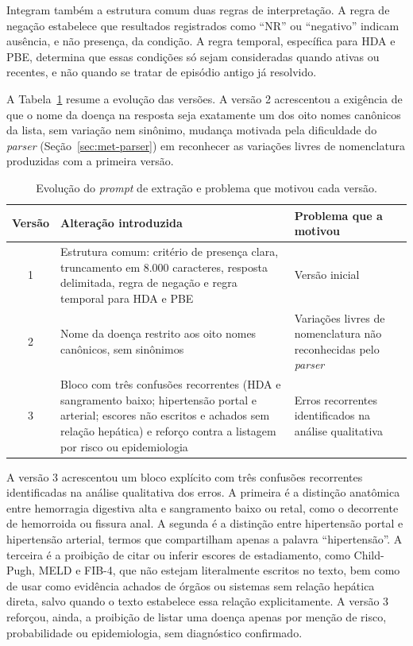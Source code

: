 Integram também a estrutura comum duas regras de interpretação. A regra de negação estabelece que resultados registrados como ``NR'' ou ``negativo'' indicam ausência, e não presença, da condição. A regra temporal, específica para HDA e PBE, determina que essas condições só sejam consideradas quando ativas ou recentes, e não quando se tratar de episódio antigo já resolvido.

A Tabela~\ref{tab:met-prompts} resume a evolução das versões. A versão 2 acrescentou a exigência de que o nome da doença na resposta seja exatamente um dos oito nomes canônicos da lista, sem variação nem sinônimo, mudança motivada pela dificuldade do \textit{parser} (Seção~\ref{sec:met-parser}) em reconhecer as variações livres de nomenclatura produzidas com a primeira versão.

\begin{table}[!htbp]
\centering
\caption{Evolução do \textit{prompt} de extração e problema que motivou cada versão.}
\label{tab:met-prompts}
\begin{tabular}{cp{7.0cm}p{5.6cm}}
\toprule
Versão & Alteração introduzida & Problema que a motivou \\
\midrule
1 & \raggedright Estrutura comum: critério de presença clara, truncamento em 8.000 caracteres, resposta delimitada, regra de negação e regra temporal para HDA e PBE & \raggedright Versão inicial \tabularnewline
2 & \raggedright Nome da doença restrito aos oito nomes canônicos, sem sinônimos & \raggedright Variações livres de nomenclatura não reconhecidas pelo \textit{parser} \tabularnewline
3 & \raggedright Bloco com três confusões recorrentes (HDA e sangramento baixo; hipertensão portal e arterial; escores não escritos e achados sem relação hepática) e reforço contra a listagem por risco ou epidemiologia & \raggedright Erros recorrentes identificados na análise qualitativa \tabularnewline
\bottomrule
\end{tabular}
\par{}
\end{table}

A versão 3 acrescentou um bloco explícito com três confusões recorrentes identificadas na análise qualitativa dos erros. A primeira é a distinção anatômica entre hemorragia digestiva alta e sangramento baixo ou retal, como o decorrente de hemorroida ou fissura anal. A segunda é a distinção entre hipertensão portal e hipertensão arterial, termos que compartilham apenas a palavra ``hipertensão''. A terceira é a proibição de citar ou inferir escores de estadiamento, como Child-Pugh, MELD e FIB-4, que não estejam literalmente escritos no texto, bem como de usar como evidência achados de órgãos ou sistemas sem relação hepática direta, salvo quando o texto estabelece essa relação explicitamente. A versão 3 reforçou, ainda, a proibição de listar uma doença apenas por menção de risco, probabilidade ou epidemiologia, sem diagnóstico confirmado.

